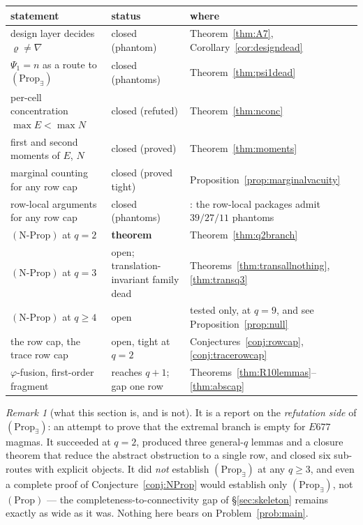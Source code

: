 \documentclass[11pt]{article}
\theoremstyle{plain}
\theoremstyle{definition}
\theoremstyle{remark}
\newtheorem*{remark*}{Remark}
\numberwithin{equation}{section}
\begin{document}
\begin{center}
\begin{tabular}{p{}p{}p{}}
\toprule
statement & status & where\\
\midrule
design layer decides $\varrho\ne\nabla$ & closed (phantom) & Theorem~\ref{thm:A7},
Corollary~\ref{cor:designdead}\\
$\Psi_1 = n$ as a route to $(\mathrm{Prop}_{\exists})$ & closed (phantoms) &
Theorem~\ref{thm:psi1dead}\\
per-cell concentration $\max E<\max N$ & closed (refuted) &
Theorem~\ref{thm:nconc}\\
first and second moments of $E$, $N$ & closed (proved) &
Theorem~\ref{thm:moments}\\
marginal counting for any row cap & closed (proved tight) &
Proposition~\ref{prop:marginalvacuity}\\
row-local arguments for any row cap & closed (phantoms) & \cite{R9I}: the row-local
packages admit $39/27/11$ phantoms\\
$(\mathrm{N}\text{-}\mathrm{Prop})$ at $q = 2$ & \textbf{theorem} &
Theorem~\ref{thm:q2branch}\\
$(\mathrm{N}\text{-}\mathrm{Prop})$ at $q = 3$ & open; translation-invariant family
dead & Theorems~\ref{thm:transallnothing}, \ref{thm:transq3}\\
$(\mathrm{N}\text{-}\mathrm{Prop})$ at $q\ge4$ & open & tested only, at $q = 9$,
and see Proposition~\ref{prop:null}\\
the row cap, the trace row cap & open, tight at $q = 2$ &
Conjectures~\ref{conj:rowcap}, \ref{conj:tracerowcap}\\
$\varphi$-fusion, first-order fragment & reaches $q+1$; gap one row &
Theorems~\ref{thm:R10lemmas}--\ref{thm:abscap}\\
\bottomrule
\end{tabular}
\end{center}

\begin{remark*}[what this section is, and is not]
It is a report on the \emph{refutation side} of $(\mathrm{Prop}_{\exists})$: an
attempt to prove that the extremal branch is empty for $E677$ magmas. It succeeded
at $q = 2$, produced three general-$q$ lemmas and a closure theorem that reduce
the abstract obstruction to a single row, and closed six sub-routes with explicit
objects. It did \emph{not} establish $(\mathrm{Prop}_{\exists})$ at any $q\ge3$,
and even a complete proof of Conjecture~\ref{conj:NProp} would establish only
$(\mathrm{Prop}_{\exists})$, not $(\mathrm{Prop})$ --- the completeness-to-connectivity
gap of \S\ref{sec:skeleton} remains exactly as wide as it was. Nothing here bears
on Problem~\ref{prob:main}.
\end{remark*}
\end{document}
